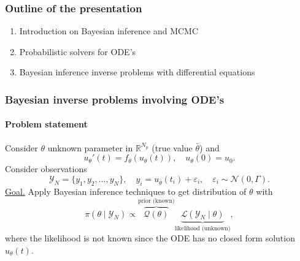 \documentclass{beamer}
\newcommand{\R}{\mathbb{R}}
\newcommand{\epl}{\varepsilon}
\begin{document}

\begin{frame}
	\frametitle{Outline of the presentation}
	\begin{enumerate}
		\item \color{mygray} Introduction on Bayesian inference and MCMC
		\item Probabilistic solvers for ODE's
		\item \color{black} Bayesian inference inverse problems with differential equations
	\end{enumerate}
\end{frame}

\begin{frame}
	\frametitle{Bayesian inverse problems involving ODE's}
	\framesubtitle{Problem statement}
	
	Consider $\theta$ unknown parameter in $\R^{N_p}$ (true value $\bar \theta$) and
	\begin{equation*}
		u_\theta' (t) = f_\theta(u_\theta(t)), \quad u_\theta(0) = u_0.
	\end{equation*}
	Consider observations 
	\begin{equation*}
			\mathcal{Y}_N = \{y_1, y_2, \ldots, y_N\}, \quad y_i = u_{\bar\theta}(t_i) + \epl_i, \quad \epl_i \sim \mathcal{N}(0, \Gamma).
	\end{equation*}
	\underline{Goal.} Apply Bayesian inference techniques to get distribution of $\theta$ with
	\begin{equation*}
		\pi(\theta\mid\mathcal Y_N) \propto \overbrace{\mathcal{Q}(\theta)}^{\text{prior (known)}}
										  \underbrace{\mathcal{L}(\mathcal Y_N\mid \theta)}_{\text{likelihood (unknown)}},
	\end{equation*}
	where the likelihood is not known since the ODE has no closed form solution $u_\theta(t)$.
\end{frame}
\end{document}
